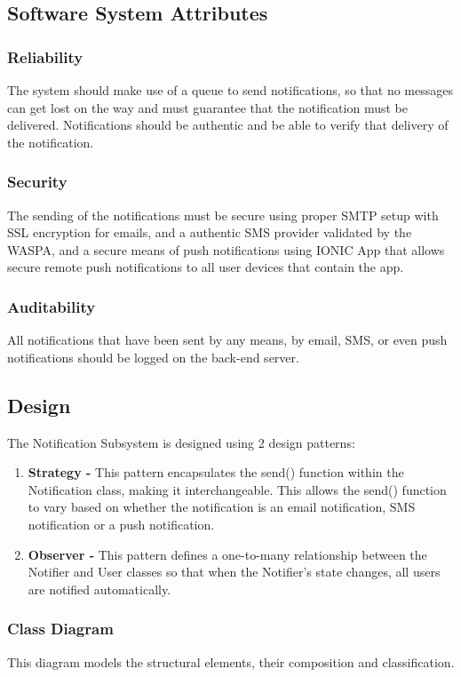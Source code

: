 \subsection{Software System Attributes}
\subsubsection{Reliability}
The system should make use of a queue to send notifications, so that no messages can get lost on the way and must guarantee that the notification must be delivered.
Notifications should be authentic and be able to verify that delivery of the notification.

\subsubsection{Security}
The sending of the notifications must be secure using proper SMTP setup with SSL encryption for emails, and a authentic SMS provider validated by the WASPA, and a secure means of push notifications using IONIC App that allows secure remote push notifications to all user devices that contain the app.

\subsubsection{Auditability}
All notifications that have been sent by any means, by email, SMS, or even push notifications should be logged on the back-end server.


\subsection{Design}
The Notification Subsystem is designed using 2 design patterns:
\begin{enumerate}
	\item \textbf{Strategy - } This pattern encapsulates the send() function within the Notification class, making it interchangeable. This allows the send() function to vary based on whether the notification is an email notification, SMS notification or a push notification.	
	\item \textbf{Observer - } This pattern defines a one-to-many relationship between the Notifier and User classes so that when the Notifier's state changes, all users are notified automatically.
\end{enumerate}
\subsubsection{Class Diagram}
This diagram models the structural elements, their composition and classification.

